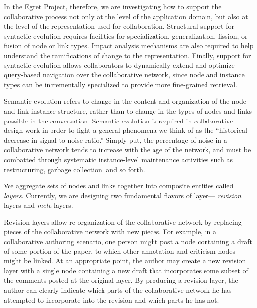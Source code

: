 In the Egret Project, therefore, we are investigating how to support
the collaborative process not only at the level of the application
domain, but also at the level of the representation used for
collaboration.  Structural support for syntactic evolution requires
facilities for specialization, generalization, fission, or fusion of
node or link types.  Impact analysis mechanisms are also required to
help understand the ramifications of change to the representation.
Finally, support for syntactic evolution allows collaborators to
dynamically extend and optimize query-based navigation over the
collaborative network, since node and instance types can be
incrementally specialized to provide more fine-grained retrieval.

Semantic evolution refers to change in the content and organization of
the node and link instance structure, rather than to change in
the types of nodes and links possible in the conversation.  Semantic
evolution is required in collaborative design work in order to fight
a general phenomena we think of as the ``historical decrease in signal-to-noise
ratio.''   Simply put, the percentage of noise in a collaborative network
tends to increase with the age of the network, and must be combatted through
systematic instance-level maintenance activities such as restructuring,
garbage collection, and so forth. 

We aggregate sets of nodes and links together into composite entities 
called {\sl layers}.  Currently, we are designing two
fundamental flavors of layer--- {\sl revision} layers and {\sl meta}
layers.  

Revision layers allow re-organization of the collaborative network by
replacing pieces of the collaborative network with new pieces.  For
example, in a collaborative authoring scenario, one person might post
a node containing a draft of some portion of the paper, to which other
annotation and criticism nodes might be linked.  At an appropriate
point, the author may create a new revision layer with a single node
containing a new draft that incorporates some subset of the comments
posted at the original layer.  By producing a revision layer, the
author can clearly indicate which parts of the collaborative network
he has attempted to incorporate into the revision and which parts he
has not.  

